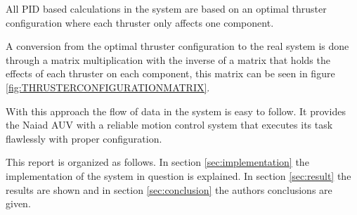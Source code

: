All PID based calculations in the system are based on an optimal thruster configuration where each thruster only affects one component.

A conversion from the optimal thruster configuration to the real system is done through a matrix multiplication with the inverse of a matrix that holds the effects of each thruster on each component, this matrix can be seen in figure \ref{fig:THRUSTERCONFIGURATIONMATRIX}.

With this approach the flow of data in the system is easy to follow. It provides the Naiad AUV with a reliable motion control system that executes its task flawlessly with proper configuration.

This report is organized as follows. In section \ref{sec:implementation} the implementation of the system in question is explained. In section \ref{sec:result} the results are shown and in section \ref{sec:conclusion} the authors conclusions are given. 
